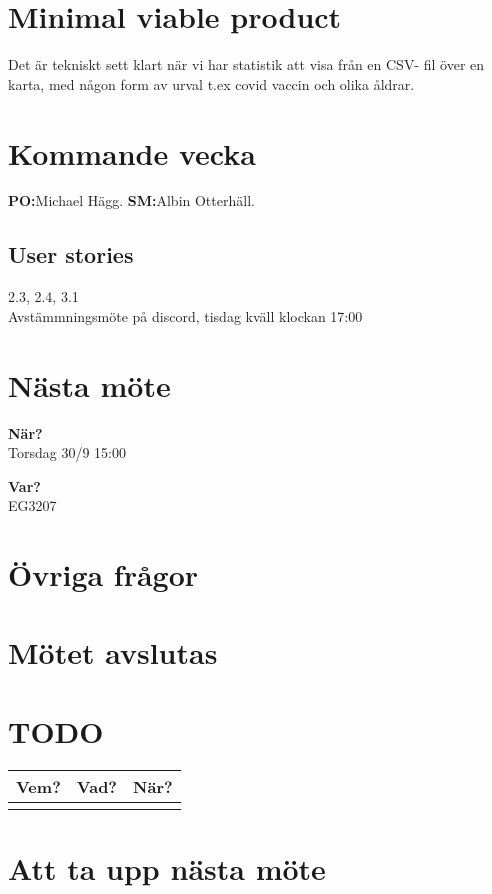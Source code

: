 \documentclass[9pt]{article}
\newcommand{\Slaget}{Albin Otterhäll\xspace}
\newcommand{\Kim}{Michael Hägg\xspace}
\begin{document}
\section{Minimal viable product}
Det är tekniskt sett klart när vi har statistik att visa från en CSV- fil över en karta, med någon form av urval t.ex covid vaccin och olika åldrar. 

\section{Kommande vecka}
\textbf{PO:}\Kim.
\textbf{SM:}\Slaget.
\subsection{User stories}
2.3, 
2.4, 
3.1\\
Avstämmningsmöte på discord, tisdag kväll klockan 17:00


\section{Nästa möte}
\textbf{När?} \\ Torsdag 30/9 15:00

\textbf{Var?} \\ EG3207

\section{Övriga frågor}

\section{Mötet avslutas}


\appendix
\section{TODO}
\begin{tabular}{| p{3cm} | p{7.5cm} | p{3cm}|}
  \hline
  \textbf{Vem?} & \textbf{Vad?} & \textbf{När?} \\ \hline
  \textbf{} & \textbf{} & \textbf{} \\ \hline


  \end{tabular}
\section{Att ta upp nästa möte}
\end{document}
